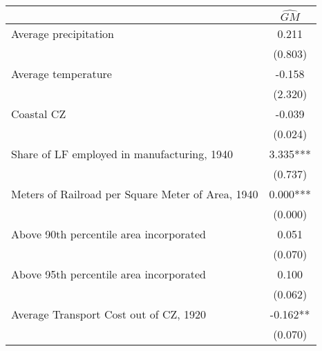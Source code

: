  \begin{tabular}{l*{1}{c}} \toprule
                &\multicolumn{1}{c}{$\widehat{GM}$}\\
\midrule
Average precipitation&    0.211   \\
                &  (0.803)   \\
\addlinespace
Average temperature&   -0.158   \\
                &  (2.320)   \\
\addlinespace
Coastal CZ      &   -0.039   \\
                &  (0.024)   \\
\addlinespace
Share of LF employed in manufacturing, 1940&    3.335***\\
                &  (0.737)   \\
\addlinespace
Meters of Railroad per Square Meter of Area, 1940&    0.000***\\
                &  (0.000)   \\
\addlinespace
Above 90th percentile area incorporated&    0.051   \\
                &  (0.070)   \\
\addlinespace
Above 95th percentile area incorporated&    0.100   \\
                &  (0.062)   \\
\addlinespace
Average Transport Cost out of CZ, 1920&   -0.162** \\
                &  (0.070)   \\
 \bottomrule \end{tabular}
